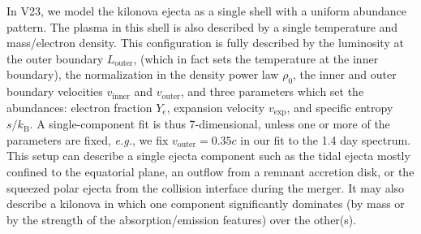 \documentclass[twocolumn, twocolappendix]{aastex63}
\def\eg{{\it e.g.}}
\begin{document}


In V23, we model the kilonova ejecta as a single shell with a uniform abundance pattern. The plasma in this shell is also described by a single temperature and mass/electron density. This configuration is fully described by the luminosity at the outer boundary $L_{\mathrm{outer}}$, (which in fact sets the temperature at the inner boundary), the normalization in the density power law $\rho_0$, the inner and outer boundary velocities $v_{\mathrm{inner}}$ and $v_{\mathrm{outer}}$, and three parameters which set the abundances: electron fraction $Y_e$, expansion velocity $v_{\mathrm{exp}}$, and specific entropy $s / k_{\mathrm{B}}$. A single-component fit is thus 7-dimensional, unless one or more of the parameters are fixed, \eg, we fix $v_{\mathrm{outer}} = 0.35c$ in our fit to the 1.4 day spectrum. This setup can describe a single ejecta component such as the tidal ejecta mostly confined to the equatorial plane, an outflow from a remnant accretion disk, or the squeezed polar ejecta from the collision interface during the merger. It may also describe a kilonova in which one component significantly dominates (by mass or by the strength of the absorption/emission features) over the other(s). 
    
\end{document}
